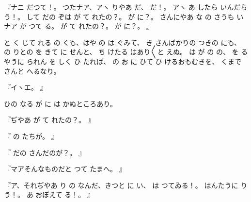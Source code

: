 『ナニ
だつて！。
つたナア、アヽ
りやあ
だ、
だ！。
アヽ
あ
したら
いんだらう！。
して
だの
ぞは
が
て
れたの？。
が
に？。
さんにやあ
な
の
さうも
いナア
が
つて
る。
が
て
れたの？。
が
に？。
』

と
く
じて
れる
の
くも、はや
の
は
ぐみて、
き
さんばかりの
つきの
にも、
の
りとの
を
きて
に
せんと、
ち
けたる
はあり〳〵と
えぬ。
は
が
の
の、
を
るやうに
られん
を
しく
ひ
たれば、
の
お
に
ひて
ひ
けるおもむきを、
くまで
さんと
へるなり。

『イヽエ。
』

ひの
なる
が
に
は
かぬところあり。

『ぢやあ
が
て
れたの？。
』

『
の
たちが。
』

『
だの
さんだのが？。
』

『マアそんなものだと
つて
たまへ。
』

『ア、それぢやあ
り
の
なんだ、きつと
に
い、
は
つてゐる！。
はんたうに
り
う！。
あ
おぼえて
る！。
』

